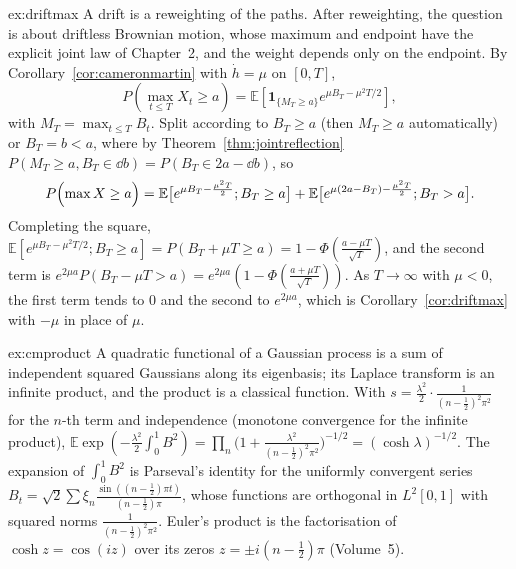 \begin{solution}{ex:driftmax}
\idea A drift is a reweighting of the paths. After reweighting, the question is about driftless Brownian motion, whose maximum and endpoint have the explicit joint law of Chapter~2, and the weight depends
only on the endpoint.
\writeup By Corollary~\ref{cor:cameronmartin} with $\dot h=\mu$ on $[0,T]$,
\[
P(\max_{t\le T}X_t\ge a)=\mathbb E[\mathbf 1_{\{M_T\ge a\}}e^{\mu B_T-\mu^2T/2}],
\]
with $M_T=\max_{t\le T}B_t$. Split according to $B_T\ge a$ (then $M_T\ge a$
automatically) or $B_T=b<a$, where by Theorem~\ref{thm:jointreflection} $P(M_T\ge a,B_T\in\dd b)=P(B_T\in2a-\dd b)$, so
\[
P\Bigl(\max X\ge a\Bigr)=\mathbb E\bigl[e^{\mu B_T-\frac{\mu^2T}2};B_T\ge a\bigr]+\mathbb E\bigl[e^{\mu(2a-B_T)-\frac{\mu^2T}2};B_T>a\bigr].
\]
Completing the square, $\mathbb E[e^{\mu B_T-\mu^2T/2};B_T\ge a]=P(B_T+\mu T\ge a)=1-\Phi(\frac{a-\mu T}{\sqrt T})$, and the second term is $e^{2\mu a}P(B_T-\mu T>a)=e^{2\mu a}(1-\Phi(\frac{a+\mu T}{\sqrt T}))$. As
$T\to\infty$ with $\mu<0$, the first term tends to $0$ and the second to $e^{2\mu a}$, which is Corollary~\ref{cor:driftmax} with $-\mu$ in place of $\mu$.
\end{solution}

\begin{solution}{ex:cmproduct}
\idea A quadratic functional of a Gaussian process is a sum of independent squared Gaussians along its eigenbasis; its Laplace transform is an infinite product, and the product is a classical function.
\writeup With $s=\frac{\lambda^2}2\cdot\frac1{(n-\frac12)^2\pi^2}$ for the $n$-th term and independence (monotone convergence for the infinite product),
$\mathbb E\exp(-\frac{\lambda^2}2\int_0^1B^2)=\prod_n\bigl(1+\frac{\lambda^2}{(n-\frac12)^2\pi^2}\bigr)^{-1/2}=(\cosh\lambda)^{-1/2}$. The expansion of $\int_0^1B^2$ is Parseval's identity for the uniformly convergent series
$B_t=\sqrt2\sum\xi_n\frac{\sin((n-\frac12)\pi t)}{(n-\frac12)\pi}$, whose functions are orthogonal in $L^2[0,1]$ with squared norms $\frac1{(n-\frac12)^2\pi^2}$. Euler's product is the factorisation of $\cosh z=\cos(iz)$ over
its zeros $z=\pm i(n-\frac12)\pi$ (Volume~5).
\end{solution}

